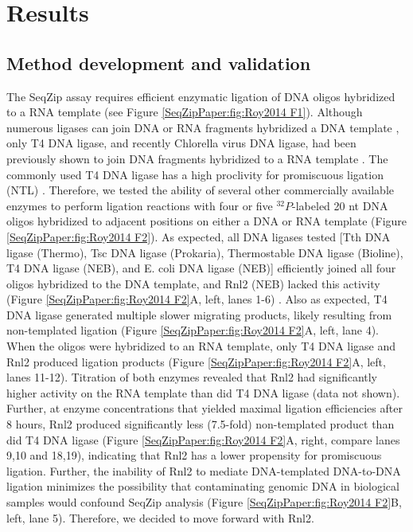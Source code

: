 \section{Results}
	\label{SeqZipPaper:sec:Results}

	\subsection{Method development and validation}
		\label{SeqZipPaper:subsec: Method Development and Validation}

		The SeqZip assay requires efficient enzymatic ligation of DNA oligos hybridized to a RNA template (see Figure \ref{SeqZipPaper:fig:Roy2014 F1}). Although numerous ligases can join DNA or RNA fragments hybridized a DNA template \citep{Bullard2006}, only T4 DNA ligase, and recently Chlorella virus DNA ligase, had been previously shown to join DNA fragments hybridized to a RNA template \citep{Nilsson2001,Lohman2013c}. The commonly used T4 DNA ligase has a high proclivity for promiscuous ligation (NTL) \citep{Kuhn2005}. Therefore, we tested the ability of several other commercially available enzymes to perform ligation reactions with four or five $^{32}P$-labeled 20 nt DNA oligos hybridized to adjacent positions on either a DNA or RNA template (Figure \ref{SeqZipPaper:fig:Roy2014 F2}). As expected, all DNA ligases tested [Tth DNA ligase (Thermo), Tsc DNA ligase (Prokaria), Thermostable DNA ligase (Bioline), T4 DNA ligase (NEB), and E. coli DNA ligase (NEB)] efficiently joined all four oligos hybridized to the DNA template, and Rnl2 (NEB) lacked this activity (Figure \ref{SeqZipPaper:fig:Roy2014 F2}A, left, lanes 1-6) \citep{Bullard2006}. Also as expected, T4 DNA ligase generated multiple slower migrating products, likely resulting from non-templated ligation (Figure \ref{SeqZipPaper:fig:Roy2014 F2}A, left, lane 4). When the oligos were hybridized to an RNA template, only T4 DNA ligase and Rnl2 produced ligation products (Figure \ref{SeqZipPaper:fig:Roy2014 F2}A, left, lanes 11-12). Titration of both enzymes revealed that Rnl2 had significantly higher activity on the RNA template than did T4 DNA ligase (data not shown). Further, at enzyme concentrations that yielded maximal ligation efficiencies after 8 hours, Rnl2 produced significantly less (7.5-fold) non-templated product than did T4 DNA ligase (Figure \ref{SeqZipPaper:fig:Roy2014 F2}A, right, compare lanes 9,10 and 18,19), indicating that Rnl2 has a lower propensity for promiscuous ligation. Further, the inability of Rnl2 to mediate DNA-templated DNA-to-DNA ligation minimizes the possibility that contaminating genomic DNA in biological samples would confound SeqZip analysis (Figure \ref{SeqZipPaper:fig:Roy2014 F2}B, left, lane 5). Therefore, we decided to move forward with Rnl2.

